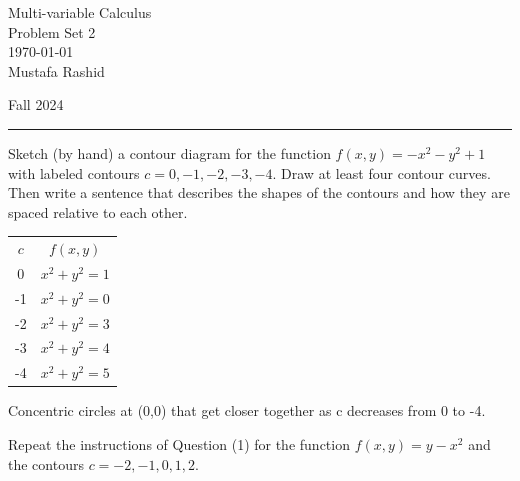 \documentclass[12pt,letterpaper, onecolumn]{exam}
\begin{document}
	
	\begingroup  
	\centering
	\LARGE Multi-variable Calculus\\
	\LARGE Problem Set 2\\[0.5em]
	\large \today\\[0.5em]
	\large Mustafa Rashid\par
	\large Fall 2024\par
	\endgroup
	\rule{\textwidth}{0.4pt}
	\pointsdroppedatright
	\printanswers
	\renewcommand{\solutiontitle}{\noindent\textbf{Ans:}\enspace}  
	
	
	\begin{questions}
		
		\question Sketch (by hand) a contour diagram for the function $f(x,y) = -x^2-y^2+1$ with labeled contours $c = 0, -1, -2, -3, -4$. Draw at least four contour curves. Then write a sentence that describes the shapes of the contours and how they are spaced relative to each other.
		\begin{solution}
			\begin{center}
			\begin{tabular}{ c c  }
				$c$& $f(x,y)$\\
			0 & $x^2+y^2=1$ \\
			-1 & $x^2+y^2=0$ \\
			-2 & $x^2+y^2=3$ \\
			-3 & $x^2+y^2=4$ \\
			-4 & $x^2+y^2=5$ \\
			\end{tabular}
			\end{center}
			Concentric circles at (0,0) that get closer together as c decreases from 0 to -4.\\
			\end{solution}
					\pagebreak
		\question Repeat the instructions of Question (1) for the function $f(x,y) = y-x^2$ and the contours $c = -2, -1, 0, 1, 2$.
		\begin{solution}
				\begin{center}

\end{center}
\end{solution}
\end{questions}
\end{document}
